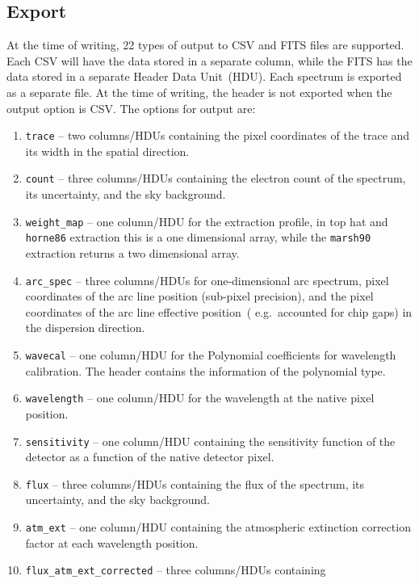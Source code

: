 \documentclass[linenumbers, twocolumn]{aastex631}
\begin{document}
\subsection{Export}
At the time of writing, 22 types of output to CSV and FITS files are supported.
Each CSV will have the data stored in a separate column, while the FITS has
the data stored in a separate Header Data Unit~(HDU). Each spectrum is exported
as a separate file. At the time of writing, the header is not exported when the
output option is CSV. The options for output are:

\begin{enumerate}
    \item \texttt{trace} -- two columns/HDUs containing the pixel coordinates
    of the trace and its width in the spatial direction.
    \item \texttt{count} -- three columns/HDUs containing the electron count
    of the spectrum, its uncertainty, and the sky background.
    \item \texttt{weight\_map} -- one column/HDU for the extraction profile,
    in top hat and \texttt{horne86} extraction this is a one dimensional array,
    while the \texttt{marsh90} extraction returns a two dimensional array.
    \item \texttt{arc\_spec} -- three columns/HDUs for one-dimensional arc
    spectrum, pixel coordinates of the arc line position (sub-pixel precision),
    and the pixel coordinates of the arc line effective position~(
    e.g.\ accounted for chip gaps) in the dispersion direction.
    \item \texttt{wavecal} -- one column/HDU for the Polynomial coefficients
    for wavelength calibration. The header contains the information of the
    polynomial type.
    \item \texttt{wavelength} -- one column/HDU for the wavelength at the
    native pixel position.
    \item \texttt{sensitivity} -- one column/HDU containing the sensitivity
    function of the detector as a function of the native detector pixel.
    \item \texttt{flux} -- three columns/HDUs containing the
    flux of the spectrum, its uncertainty, and the sky background.
    \item \texttt{atm\_ext} -- one column/HDU containing the atmospheric
    extinction correction factor at each wavelength position.
    \item \texttt{flux\_atm\_ext\_corrected} -- three columns/HDUs containing

\end{enumerate}
\end{document}
